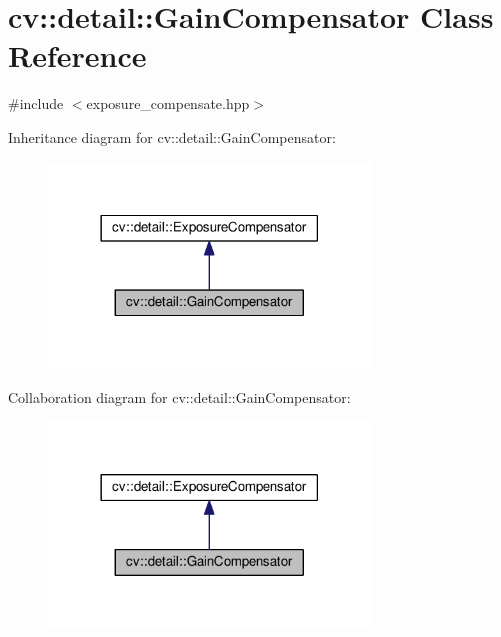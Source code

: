 \hypertarget{classcv_1_1detail_1_1GainCompensator}{\section{cv\-:\-:detail\-:\-:Gain\-Compensator Class Reference}
\label{classcv_1_1detail_1_1GainCompensator}
}


{\ttfamily \#include $<$exposure\-\_\-compensate.\-hpp$>$}



Inheritance diagram for cv\-:\-:detail\-:\-:Gain\-Compensator\-:\nopagebreak
\begin{figure}[H]
\begin{center}
\leavevmode
\includegraphics[width=242pt]{classcv_1_1detail_1_1GainCompensator__inherit__graph}
\end{center}
\end{figure}


Collaboration diagram for cv\-:\-:detail\-:\-:Gain\-Compensator\-:\nopagebreak
\begin{figure}[H]
\begin{center}
\leavevmode
\includegraphics[width=242pt]{classcv_1_1detail_1_1GainCompensator__coll__graph}
\end{center}
\end{figure}
